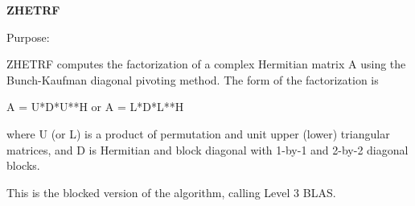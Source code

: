 {\bfseries Z\+H\+E\+T\+R\+F} 

 \begin{DoxyParagraph}{Purpose\+: }
\begin{DoxyVerb} ZHETRF computes the factorization of a complex Hermitian matrix A
 using the Bunch-Kaufman diagonal pivoting method.  The form of the
 factorization is

    A = U*D*U**H  or  A = L*D*L**H

 where U (or L) is a product of permutation and unit upper (lower)
 triangular matrices, and D is Hermitian and block diagonal with
 1-by-1 and 2-by-2 diagonal blocks.

 This is the blocked version of the algorithm, calling Level 3 BLAS.\end{DoxyVerb}
 
\end{DoxyParagraph}

